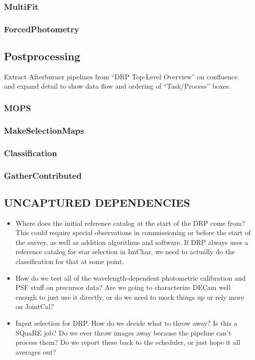 \subsubsection{MultiFit}
\label{sec:drpMultiFit}
\subsubsection{ForcedPhotometry}
\label{sec:drpForcedPhotometry}

\subsection{Postprocessing}
\label{sec:drp_postprocessing}

\begin{note}
Extract Afterburner pipelines from ``DRP Top-Level Overview'' on confluence and expand detail to show data flow and ordering of ``Task/Process'' boxes.
\end{note}

\subsubsection{MOPS}
\label{sec:drpMOPS}
\subsubsection{MakeSelectionMaps}
\label{sec:drpMakeSelectionMaps}
\subsubsection{Classification}
\label{sec:drpClassification}
\subsubsection{GatherContributed}
\label{sec:drpGatherContributed}

\subsection{UNCAPTURED DEPENDENCIES}

\begin{itemize}
\item Where does the initial reference catalog at the start of the DRP come from?  This could require special observations in commissioning or before the start of the survey, as well as addition algorithms and software.  If DRP always uses a reference catalog for star selection in ImChar, we need to actually do the classification for that at some point.
\item How do we test all of the wavelength-dependent photometric calibration and PSF stuff on precursor data?  Are we going to characterize DECam well enough to just use it directly, or do we need to mock things up or rely more on JointCal?
\item Input selection for DRP.  How do we decide what to throw away?  Is this a SQuaRE job?  Do we ever throw images away because the pipeline can't process them?  Do we report these back to the scheduler, or just hope it all averages out?
\end{itemize}

